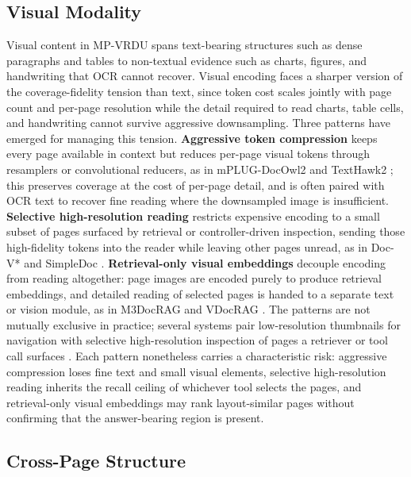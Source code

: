 \documentclass[11pt]{article}
\begin{document}
\subsection{Visual Modality}
\label{sec:modality-visual}

Visual content in MP-VRDU spans text-bearing structures such as dense paragraphs and tables to non-textual evidence such as charts, figures, and handwriting that OCR cannot recover. Visual encoding faces a sharper version of the coverage-fidelity tension than text, since token cost scales jointly with page count and per-page resolution while the detail required to read charts, table cells, and handwriting cannot survive aggressive downsampling. Three patterns have emerged for managing this tension. \textbf{Aggressive token compression} keeps every page available in context but reduces per-page visual tokens through resamplers or convolutional reducers, as in mPLUG-DocOwl2 \cite{hu2025mplugdocowl2} and TextHawk2 \cite{yu2024texthawk2}; this preserves coverage at the cost of per-page detail, and is often paired with OCR text to recover fine reading where the downsampled image is insufficient. \textbf{Selective high-resolution reading} restricts expensive encoding to a small subset of pages surfaced by retrieval or controller-driven inspection, sending those high-fidelity tokens into the reader while leaving other pages unread, as in Doc-V* \cite{zheng2026docv} and SimpleDoc \cite{jain2025simpledoc}. \textbf{Retrieval-only visual embeddings} decouple encoding from reading altogether: page images are encoded purely to produce retrieval embeddings, and detailed reading of selected pages is handed to a separate text or vision module, as in M3DocRAG \cite{cho2024m3docrag} and VDocRAG \cite{tanaka2025vdocrag}. The patterns are not mutually exclusive in practice; several systems pair low-resolution thumbnails for navigation with selective high-resolution inspection of pages a retriever or tool call surfaces \cite{zheng2026docv,jain2025simpledoc}. Each pattern nonetheless carries a characteristic risk: aggressive compression loses fine text and small visual elements, selective high-resolution reading inherits the recall ceiling of whichever tool selects the pages, and retrieval-only visual embeddings may rank layout-similar pages without confirming that the answer-bearing region is present.

\subsection{Cross-Page Structure}
\label{sec:modality-structure}
\end{document}
